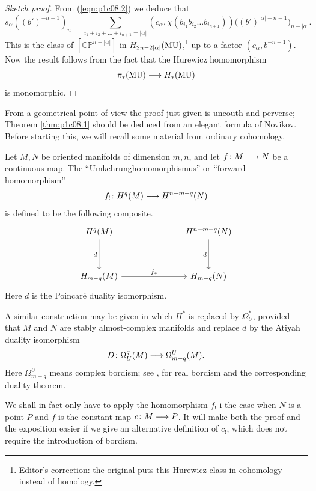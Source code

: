 \documentclass[../main]{subfiles}
\begin{document}
\begin{proof}[Sketch proof]
From (\ref{eqn:p1c08.2}) we deduce that
\[s_\alpha((b')^{-n-1})_n = \sum_{i_1 + i_2 + \dots + i_{n+1} = |\alpha|} (c_\alpha , \chi(b_{i_1} b_{i_2} \dots b_{i_{n+1}}))\big((b')^{|\alpha| - n - 1}\big)_{n-|\alpha|}.\]
This is the class of $[\mathbb{CP}^{n-|\alpha|}]$ in $H_{2n-2|\alpha|}(\mathrm{MU})$,\footnote{Editor's correction: the original puts this Hurewicz class in cohomology instead of homology.} up to a factor $(c_\alpha, b^{-n-1})$. Now the result follows from the fact that the Hurewicz homomorphism
\[\pi_*(\mathrm{MU}) \longrightarrow H_*(\mathrm{MU})\]
is monomorphic.
\end{proof}

From a geometrical point of view the proof just given is uncouth and perverse; Theorem \ref{thm:p1c08.1} should be deduced from an elegant formula of Novikov. Before starting this, we will recall some material from ordinary cohomology.

Let $M,N$ be oriented manifolds of dimension $m,n$, and let $f \colon M \longrightarrow N$ be a continuous map. The ``Umkehrunghomomorphismus'' or ``forward homomorphism''
\[f_! \colon H^q(M) \longrightarrow H^{n-m+q}(N)\]
is defined to be the following composite.
\[\begin{tikzcd}
H^q(M) \arrow[dd, "d"']    &  &  & H^{n-m+q}(N) \arrow[dd, "d"'] \\
                           &  &  &                               \\
H_{m-q}(M) \arrow[rrr, "f_*"] &  &  & H_{m-q}(N)
\end{tikzcd}\]
Here $d$ is the Poincar\'e duality isomorphism.

A similar construction may be given in which $H^*$ is replaced by $\Omega_U^*$, provided that $M$ and $N$ are stably almost-complex manifolds and replace $d$ by the Atiyah duality isomorphism
\[D \colon \Omega_U^q(M) \longrightarrow \Omega_{m-q}^U(M).\]
Here $\Omega_{m-q}^U$ means complex bordism; see \cite{atiyah}, for real bordism and the corresponding duality theorem.

We shall in fact only have to apply the homomorphism $f_!$ i the case when $N$ is a point $P$ and $f$ is the constant map $c \colon M \longrightarrow P$. It will make both the proof and the exposition easier if we give an alternative definition of $c_!$, which does not require the introduction of bordism.
\end{document}
